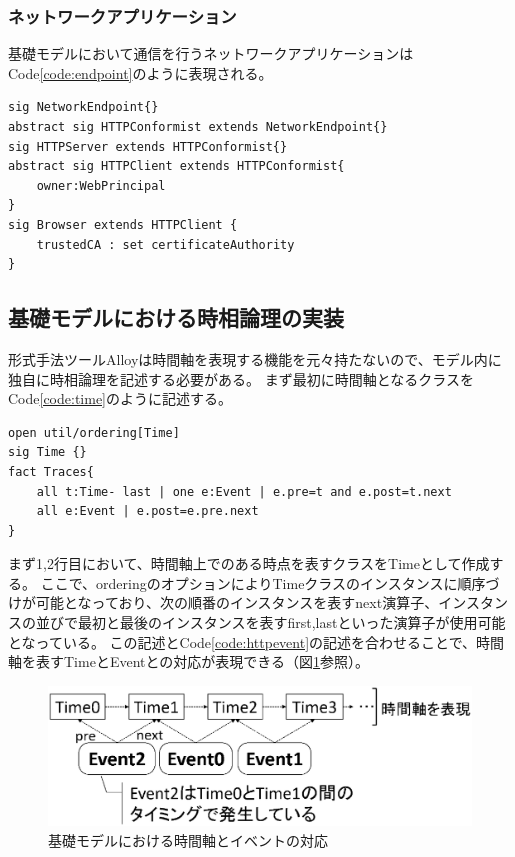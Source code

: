 \documentclass[12pt,a4paper]{jbook}
\begin{document}

\subsubsection{ネットワークアプリケーション}
基礎モデルにおいて通信を行うネットワークアプリケーションはCode\ref{code:endpoint}のように表現される。
\begin{lstlisting}[caption=ネットワーク参加者, label=code:endpoint]
sig NetworkEndpoint{}
abstract sig HTTPConformist extends NetworkEndpoint{}
sig HTTPServer extends HTTPConformist{}
abstract sig HTTPClient extends HTTPConformist{
	owner:WebPrincipal
}
sig Browser extends HTTPClient {
	trustedCA : set certificateAuthority
}
\end{lstlisting}


\subsection{基礎モデルにおける時相論理の実装}
\label{sec:based-model-temporal-logic}
形式手法ツールAlloyは時間軸を表現する機能を元々持たないので、モデル内に独自に時相論理を記述する必要がある。
まず最初に時間軸となるクラスをCode\ref{code:time}のように記述する。
\begin{lstlisting}[caption=基礎モデルにおける時間軸, label=code:time]
open util/ordering[Time]
sig Time {}
fact Traces{
	all t:Time- last | one e:Event | e.pre=t and e.post=t.next
	all e:Event | e.post=e.pre.next
}
\end{lstlisting}
まず1,2行目において、時間軸上でのある時点を表すクラスをTimeとして作成する。
ここで、orderingのオプションによりTimeクラスのインスタンスに順序づけが可能となっており、次の順番のインスタンスを表すnext演算子、インスタンスの並びで最初と最後のインスタンスを表すfirst,lastといった演算子が使用可能となっている。
この記述とCode\ref{code:httpevent}の記述を合わせることで、時間軸を表すTimeとEventとの対応が表現できる（図\ref{fig:existing-model-temporal-logic}参照）。

\begin{figure}[htb]
\centering
\includegraphics[width=400pt]{./fig/existing-model-temporal-logic.eps}
\caption{基礎モデルにおける時間軸とイベントの対応}
\label{fig:existing-model-temporal-logic}
\end{figure}
\color{black}
\end{document}
